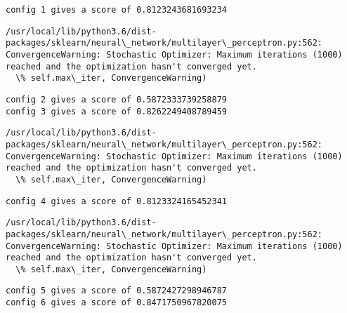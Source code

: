 \documentclass[11pt]{article}
\begin{document}
    \begin{Verbatim}[commandchars=\\\{\}]
config 1 gives a score of 0.8123243681693234

    \end{Verbatim}

    \begin{Verbatim}[commandchars=\\\{\}]
/usr/local/lib/python3.6/dist-packages/sklearn/neural\_network/multilayer\_perceptron.py:562: ConvergenceWarning: Stochastic Optimizer: Maximum iterations (1000) reached and the optimization hasn't converged yet.
  \% self.max\_iter, ConvergenceWarning)

    \end{Verbatim}

    \begin{Verbatim}[commandchars=\\\{\}]
config 2 gives a score of 0.5872333739258879
config 3 gives a score of 0.8262249408789459

    \end{Verbatim}

    \begin{Verbatim}[commandchars=\\\{\}]
/usr/local/lib/python3.6/dist-packages/sklearn/neural\_network/multilayer\_perceptron.py:562: ConvergenceWarning: Stochastic Optimizer: Maximum iterations (1000) reached and the optimization hasn't converged yet.
  \% self.max\_iter, ConvergenceWarning)

    \end{Verbatim}

    \begin{Verbatim}[commandchars=\\\{\}]
config 4 gives a score of 0.8123324165452341

    \end{Verbatim}

    \begin{Verbatim}[commandchars=\\\{\}]
/usr/local/lib/python3.6/dist-packages/sklearn/neural\_network/multilayer\_perceptron.py:562: ConvergenceWarning: Stochastic Optimizer: Maximum iterations (1000) reached and the optimization hasn't converged yet.
  \% self.max\_iter, ConvergenceWarning)

    \end{Verbatim}

    \begin{Verbatim}[commandchars=\\\{\}]
config 5 gives a score of 0.5872427298946787
config 6 gives a score of 0.8471750967820075

    \end{Verbatim}
\end{document}
